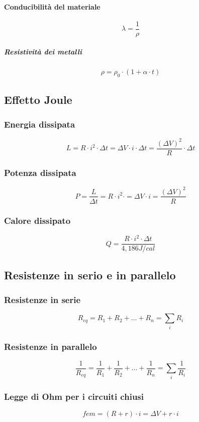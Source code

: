 \documentclass[a4paper,12pt]{article}
\theoremstyle{mystyle}
\begin{document}
\paragraph{Conducibilità del materiale}
\[\lambda = \frac{1}{\rho}\]
\subparagraph{Resistività dei metalli}
\[\rho = \rho_0 \cdot (1 + \alpha \cdot t)\]

\newpage


\subsection{Effetto Joule}
\subsubsection{Energia dissipata}
\[L = R \cdot i ^2 \cdot \Delta t = \Delta V \cdot i \cdot \Delta t = \frac{(\Delta V)^2}{R} \cdot \Delta t\]
\subsubsection{Potenza dissipata}
\[P = \frac{L}{\Delta t} = R \cdot i^2 \cdot = \Delta V \cdot i = \frac{(\Delta V)^2}{R}\]
\subsubsection{Calore dissipato}
\[ Q = \frac{R \cdot i^2 \cdot \Delta t}{4,186  J/cal}\]

\newpage


\subsection{Resistenze in serio e in parallelo}
\subsubsection{Resistenze in serie}
\[R_{eq}= R_1 + R_2 + \ldots + R_n = \sum_i R_i\]
\subsubsection{Resistenze in parallelo}
\[\frac{1}{R_{eq}} = \frac{1}{R_1}+ \frac{1}{R_2}+ \ldots + \frac{1}{R_n} = \sum_i \frac{1}{R_i}\]
\subsubsection{Legge di Ohm per i circuiti chiusi}
\[fem = (R+r) \cdot i = \Delta V + r \cdot i\]

\newpage
\end{document}
